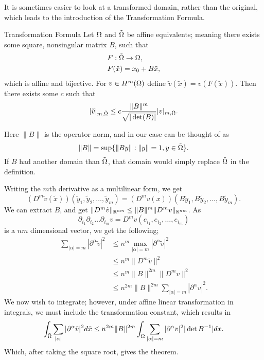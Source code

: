 It is sometimes easier to look at a transformed domain, rather than the original, which leads to the introduction of the Transformation Formula.

\begin{thmx}{Transformation Formula\label{thm:transformation}}
    Let $\Omega$ and $\tilde{\Omega}$ be affine equivalents; meaning 
    there exists some square, nonsingular matrix $B$, such that 
    \begin{align*}
        &F: \tilde{\Omega}\to \Omega, \\
        &F(\tilde{x}) = x_0 + B\tilde{x},
    \end{align*}
    which is affine and bijective. For $v\in H^m(\Omega)$ define 
    $\tilde{v}(\tilde{x}) = v(F(\tilde{x}))$.
    Then there exists some $c$ such that 
    \begin{equation*}
        |\tilde{v}|_{m,\tilde{\Omega}} \leq 
        c \frac{\|B\|^m }{\sqrt{|\det(B)|}}|v|_{m,\Omega}.
    \end{equation*}
\end{thmx}
Here $\|B\|$ is the operator norm, and in our case can be thought of 
as 
\begin{equation*}
    \|B\| = \sup\{ \| By\| :\|y\| = 1, y \in \tilde{\Omega} \}.
\end{equation*}
If $B$ had another domain than $\tilde{\Omega}$, that domain would simply 
replace $\tilde{\Omega}$ in the definition.
\begin{bev}
   Writing the $m$th derivative as a multilinear form, we get 
   \begin{equation*}
    (D^m\tilde{v}(\tilde{x}))(\tilde{y}_1, \tilde{y}_2, \ldots, \tilde{y}_m )=
    (D^m v(x))(B\tilde{y}_1, B\tilde{y}_2, \ldots, B\tilde{y}_m ).
   \end{equation*} 
We can extract $B$, and get $\|D^m \tilde{v}\|_{\mathbb{R}^{nm}} \leq \|B\|^m \|D^m v\|_{\mathbb{R}^{nm}}$.
As 
\[\partial_{i_{1}}\partial_{i_{2}}\ldots \partial_{i_{m}} v = D^m v(e_{i_1},e_{i_2}, \ldots, e_{i_m})\]
is a $nm$ dimensional vector, we get the following;
\begin{align*}
    \sum_{|\alpha| = m} | \partial ^\alpha \tilde{v} |^2 & \leq n^m \max_{|\alpha|=m} |\partial ^\alpha \tilde{v}|^2 \\
    &\leq n^m \|D^m\tilde{v}\|^2 \\
    &\leq n^m \|B\|^{2m}\|D^m v\|^2 \\
    &\leq n^{2m}\|B\|^{2m} \sum_{|\alpha|=m}|\partial ^\alpha v|^2.
\end{align*}
We now wish to integrate; however, under affine linear transformation in integrals, 
we must include the transformation constant, which results in 
\begin{equation*}
    \int_{\tilde{\Omega}} \sum_{|\alpha|} | \partial ^\alpha \tilde{v} |^2 d\tilde{x}
    \leq n^{2m}\|B\|^{2m}\int_{\Omega} \sum_{|\alpha|=m}|\partial ^\alpha v|^2 |\det B^{-1}| dx.
\end{equation*}
Which, after taking the square root, gives the theorem.
\end{bev}